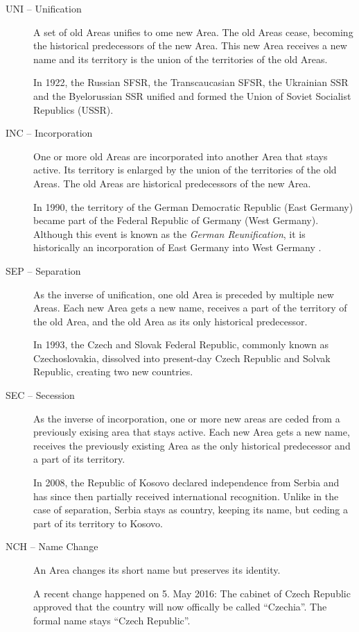 \begin{description}
  \item[UNI -- Unification]
  A set of old Areas unifies to ome new Area. The old Areas cease, becoming the historical predecessors of the new Area. This new Area receives a new name and its territory is the union of the territories of the old Areas. \\
  \begin{footnotesize}
    In 1922, the Russian SFSR, the Transcaucasian SFSR, the Ukrainian SSR and the Byelorussian SSR unified and formed the Union of Soviet Socialist Republics (USSR).
  \end{footnotesize}
  \item[INC -- Incorporation]
  One or more old Areas are incorporated into another Area that stays active. Its territory is enlarged by the union of the territories of the old Areas. The old Areas are historical predecessors of the new Area. \\
  \begin{footnotesize}
    In 1990, the territory of the German Democratic Republic (East Germany) became part of the Federal Republic of Germany (West Germany). Although this event is known as the \emph{German Reunification}, it is historically an incorporation of East Germany into West Germany \cite{incorporationEastWestGermany}.
  \end{footnotesize}
  \item[SEP -- Separation]
  As the inverse of unification, one old Area is preceded by multiple new Areas. Each new Area gets a new name, receives a part of the territory of the old Area, and the old Area as its only historical predecessor. \\
  \begin{footnotesize}
    In 1993, the Czech and Slovak Federal Republic, commonly known as Czechoslovakia, dissolved into present-day Czech Republic and Solvak Republic, creating two new countries.
  \end{footnotesize}
  \item[SEC -- Secession]
  As the inverse of incorporation, one or more new areas are ceded from a previously exising area that stays active. Each new Area gets a new name, receives the previously existing Area as the only historical predecessor and a part of its territory. \\
  \begin{footnotesize}
    In 2008, the Republic of Kosovo declared independence from Serbia and has since then partially received international recognition. Unlike in the case of separation, Serbia stays as country, keeping its name, but ceding a part of its territory to Kosovo.
  \end{footnotesize}
  \item[NCH -- Name Change]
  An Area changes its short name but preserves its identity. \\
  \begin{footnotesize}
    A recent change happened on 5. May 2016: The cabinet of Czech Republic approved that the country will now offically be called ``Czechia''. The formal name stays ``Czech Republic''.
  \end{footnotesize}
\end{description}


